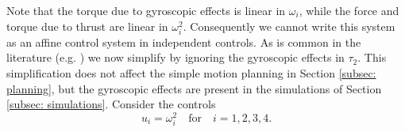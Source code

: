 \documentclass{aims}
\theoremstyle{definition}
\begin{document}
Note that the torque due to gyroscopic effects is linear in $\omega_i$, while the force and torque due to thrust are linear in $\omega_i^2$.  Consequently we cannot write this system as an affine control system in independent controls.  As is common in the literature (e.g. \cite{Mueller, Stepanyan}) we now simplify by ignoring the gyroscopic effects in $\tau_2$.  This simplification does not affect the simple motion planning in Section \ref{subsec: planning}, but the gyroscopic effects are present in the simulations of Section \ref{subsec: simulations}.
Consider the controls
$$u_i=\omega_i^2 \quad \text{for} \quad i=1,2,3,4. %
$$
\end{document}
